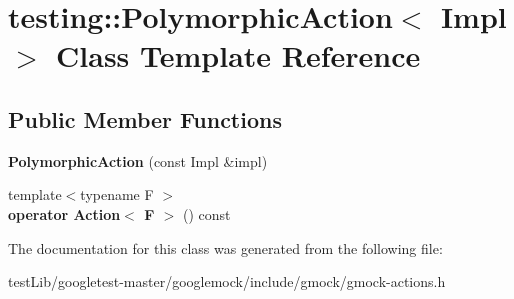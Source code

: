 \hypertarget{classtesting_1_1PolymorphicAction}{}\section{testing\+:\+:Polymorphic\+Action$<$ Impl $>$ Class Template Reference}
\label{classtesting_1_1PolymorphicAction}
\subsection*{Public Member Functions}
\begin{DoxyCompactItemize}
\item 
\mbox{\label{classtesting_1_1PolymorphicAction_a062e5a45ad61dcf8085b15cc882ca0ae}} 
{\bfseries Polymorphic\+Action} (const Impl \&impl)
\item 
\mbox{\label{classtesting_1_1PolymorphicAction_ac35461616cc15c06f1a2f9ee1c03fb8f}} 
{\footnotesize template$<$typename F $>$ }\\{\bfseries operator Action$<$ F $>$} () const
\end{DoxyCompactItemize}


The documentation for this class was generated from the following file\+:\begin{DoxyCompactItemize}
\item 
test\+Lib/googletest-\/master/googlemock/include/gmock/gmock-\/actions.\+h\end{DoxyCompactItemize}
